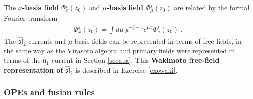 \documentclass[12pt, a4paper, notitlepage, twoside]{report}
\numberwithin{equation}{section}
\theoremstyle{break}
\begin{document}
The \textbf{\boldmath $x$-basis field} $\Phi^j_x(z_0)$ and \textbf{\boldmath $\mu$-basis field} $\Phi^j_\mu(z_0)$ are related by the formal Fourier transform
\begin{align}
 \Phi_x^j(z_0) = \int d\mu\ \mu^{-j-1}e^{\mu x} \Phi_\mu^j(z_0)\ .
\label{emx}
\end{align}
The $\widehat{\mathfrak{sl}}_2$ currents and $\mu$-basis fields can be represented in terms of free fields, in the same way as the Virasoro algebra and primary fields were represented in terms of the $\hat{\mathfrak{u}}_1$ current in Section \ref{secaua}.
This \textbf{Wakimoto free-field representation of $\widehat{\mathfrak{sl}}_2$} is described in Exercise \ref{exowaki}.

\subsubsection{OPEs and fusion rules}
\end{document}
